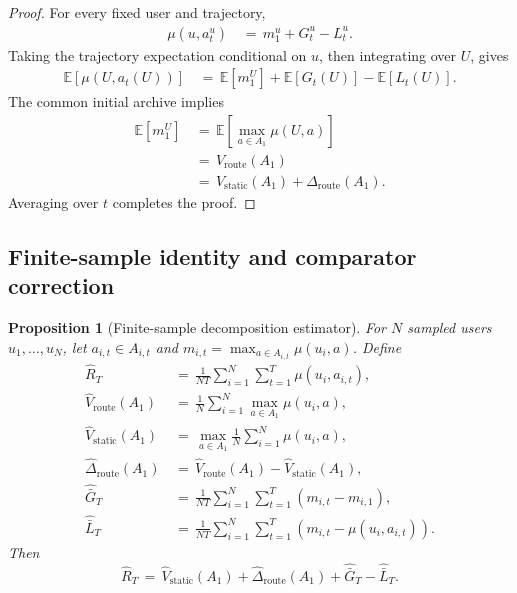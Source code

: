 \documentclass{article} %
\newtheorem{proposition}[theorem]{Proposition}
\begin{document}
\begin{proof}
For every fixed user and trajectory,
\begin{equation}
\begin{aligned}
\mu(u,a_t^u)
&\,=\,
m_1^u
+
G_t^u
-
L_t^u.
\end{aligned}
\end{equation}
Taking the trajectory expectation conditional on \(u\), then integrating over
\(U\), gives
\begin{equation}
\begin{aligned}
\mathbb{E}[\mu(U,a_t(U))]
&\,=\,
\mathbb{E}[m_1^U]
+
\mathbb{E}[G_t(U)]
-
\mathbb{E}[L_t(U)].
\end{aligned}
\end{equation}
The common initial archive implies
\begin{equation}
\begin{aligned}
\mathbb{E}[m_1^U]
&\,=\,
\mathbb{E}\!\left[
\max_{a\in A_1}
\mu(U,a)
\right]
\\
&\,=\,
V_{\mathrm{route}}(A_1)
\\
&\,=\,
V_{\mathrm{static}}(A_1)
+
\Delta_{\mathrm{route}}(A_1).
\end{aligned}
\end{equation}
Averaging over \(t\) completes the proof.
\end{proof}

\subsection{Finite-sample identity and comparator correction}

\begin{proposition}[Finite-sample decomposition estimator]
\label{prop:6}
For \(N\) sampled users \(u_1,\ldots,u_N\), let
\(a_{i,t}\in A_{i,t}\) and
\(m_{i,t}=\max_{a\in A_{i,t}}\mu(u_i,a)\).  Define
\begin{equation}
\begin{aligned}
\widehat R_T
&\,=\,
\frac{1}{NT}
\sum_{i=1}^{N}
\sum_{t=1}^{T}
\mu(u_i,a_{i,t}), \\
\widehat V_{\mathrm{route}}(A_1)
&\,=\,
\frac{1}{N}
\sum_{i=1}^{N}
\max_{a\in A_1}
\mu(u_i,a), \\
\widehat V_{\mathrm{static}}(A_1)
&\,=\,
\max_{a\in A_1}
\frac{1}{N}
\sum_{i=1}^{N}
\mu(u_i,a), \\
\widehat\Delta_{\mathrm{route}}(A_1)
&\,=\,
\widehat V_{\mathrm{route}}(A_1)
-
\widehat V_{\mathrm{static}}(A_1), \\
\widehat{\bar G}_T
&\,=\,
\frac{1}{NT}
\sum_{i=1}^{N}
\sum_{t=1}^{T}
(m_{i,t}-m_{i,1}), \\
\widehat{\bar L}_T
&\,=\,
\frac{1}{NT}
\sum_{i=1}^{N}
\sum_{t=1}^{T}
(m_{i,t}-\mu(u_i,a_{i,t})).
\end{aligned}
\end{equation}
Then
\begin{equation}
\widehat R_T
\,=\,
\widehat V_{\mathrm{static}}(A_1)
+
\widehat\Delta_{\mathrm{route}}(A_1)
+
\widehat{\bar G}_T
-
\widehat{\bar L}_T.
\end{equation}
\end{proposition}
\end{document}
